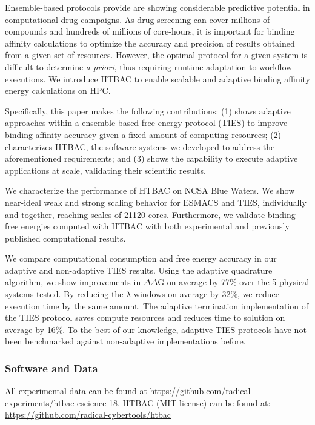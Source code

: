 Ensemble-based protocols provide are showing considerable predictive
potential in computational drug campaigns. As drug screening can cover
millions of compounds and hundreds of millions of core-hours, it is important
for binding affinity calculations to optimize the accuracy and precision of
results obtained from a given set of resources. However, the optimal protocol
for a given system is difficult to determine {\it a priori}, thus requiring
runtime adaptation to workflow executions. We introduce HTBAC to enable
scalable and adaptive binding affinity energy calculations on HPC.

Specifically, this paper makes the following contributions: (1) shows
adaptive approaches within a ensemble-based free energy protocol (TIES) to
improve binding affinity accuracy given a fixed amount of computing
resources; (2) characterizes HTBAC, the software systems we developed to
address the aforementioned requirements; and (3) shows the capability to
execute adaptive applications at scale, validating their scientific results.

We characterize the performance of HTBAC on NCSA Blue Waters. We show
near-ideal weak and strong scaling behavior for ESMACS and TIES, individually
and together, reaching scales of 21120 cores. Furthermore, we validate
binding free energies computed with HTBAC with both experimental and
previously published computational results.

We compare computational consumption and free energy accuracy in our adaptive
and non-adaptive TIES results. Using the adaptive quadrature algorithm, we
show improvements in $\Delta \Delta$G on average by 77\% over the 5 physical
systems tested. By reducing the $\lambda$ windows on average by 32\%, we
reduce execution time by the same amount. The adaptive termination
implementation of the TIES protocol saves compute resources and reduces time
to solution on average by 16\%. To the best of our knowledge, adaptive TIES
protocols have not been benchmarked against non-adaptive implementations
before.

\subsubsection*{Software and Data}

{\footnotesize All experimental data can be found at
\url{https://github.com/radical-experiments/htbac-escience-18}. HTBAC (MIT
license) can be found at: \url{https://github.com/radical-cybertools/htbac}}

